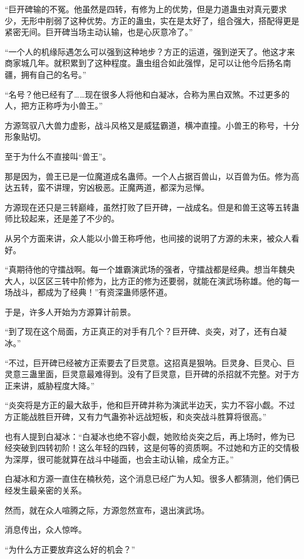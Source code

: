 \begin{this_body}
“巨开碑输的不冤。他虽然是四转，有修为上的优势，但是力道蛊虫对真元要求少，无形中削弱了这种优势。方正的蛊虫，实在是太好了，组合强大，搭配得更是紧密无间。巨开碑当场主动认输，也是心灰意冷了。”

“一个人的机缘际遇怎么可以强到这种地步？方正的运道，强到逆天了。他这才来商家城几年。就积累到了这种程度。蛊虫组合如此强悍，足可以让他今后扬名南疆，拥有自己的名号。”

“名号？他已经有了……现在很多人将他和白凝冰，合称为黑白双煞。不过更多的人，把方正称呼为小兽王。”

方源驾驭八大兽力虚影，战斗风格又是威猛霸道，横冲直撞。小兽王的称号，十分形象贴切。

至于为什么不直接叫“兽王”。

那是因为，兽王已是一位魔道成名蛊师。一个人占据百兽山，以百兽为伍。修为高达五转，蛮不讲理，穷凶极恶。正魔两道，都深为忌惮。

方源现在还只是三转巅峰，虽然打败了巨开碑，一战成名。但是和兽王这等五转蛊师比较起来，还是差了不少的。

从另个方面来讲，众人能以小兽王称呼他，也间接的说明了方源的未来，被众人看好。

“真期待他的守擂战啊。每一个雄霸演武场的强者，守擂战都是经典。想当年魏央大人，以区区三转中阶修为，比方正的修为还要弱，就能在演武场称雄。他的每一场战斗，都成为了经典！”有资深蛊师感怀道。

于是，许多人开始为方源算计前景。

“到了现在这个局面，方正真正的对手有几个？巨开碑、炎突，对了，还有白凝冰。”

“不过，巨开碑已经被方正索要去了巨灵意。这招真是狠呐。巨灵身、巨灵心、巨灵意三蛊里面，巨灵意最难得到。没有了巨灵意，巨开碑的杀招就不完整。对于方正来讲，威胁程度大降。”

“炎突将是方正的最大敌手，他和巨开碑并称为演武半边天，实力不容小觑。不过方正能战胜巨开碑，又有力气蛊弥补远战短板，和炎突战斗胜算将很高。”

也有人提到白凝冰：“白凝冰也绝不容小觑，她败给炎突之后，再上场时，修为已经突破到四转初阶！这么年轻的四转，这是何等的资质啊。不过她和方正的交情极为深厚，很可能就算在战斗中碰面，也会主动认输，成全方正。”

白凝冰和方源一直住在楠秋苑，这个消息已经广为人知。很多人都猜测，他们俩已经发生最亲密的关系。

然而，就在众人喧腾之际，方源忽然宣布，退出演武场。

消息传出，众人惊哗。

“为什么方正要放弃这么好的机会？”


\end{this_body}
